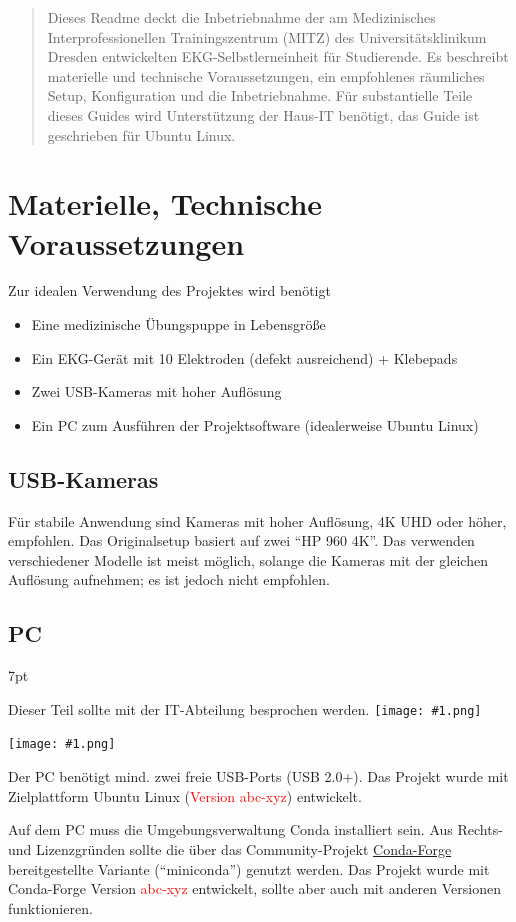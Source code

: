 \documentclass[a4paper]{article}
\newcommand{\warn}[1]{\textcolor{red}{#1}}
\newcommand{\emoji}[1]{
    \begingroup\normalfont
    \texttt{[image: \#1.png]}
    \endgroup
}
\newenvironment{formal}{%
    \def\FrameCommand{%
    \hspace{1pt}%
    {\color{coolpurple}\vrule width 2pt}%
    {\color{formalshade}\vrule width 4pt}%
    \colorbox{formalshade}%
    }%
    \MakeFramed{\advance\hsize-\width\FrameRestore}%
    \noindent\hspace{-4.55pt}%
    \begin{adjustwidth}{}{7pt}%
    \vspace{2pt}\vspace{2pt}%
}
{%
    \vspace{2pt}\end{adjustwidth}\endMakeFramed%
}
\begin{document}
\begin{abstract}
    Dieses Readme deckt die Inbetriebnahme der am Medizinisches Interprofessionellen Trainingszentrum (MITZ) des Universitätsklinikum Dresden entwickelten EKG-Selbstlerneinheit für Studierende. Es beschreibt materielle und technische Voraussetzungen, ein empfohlenes räumliches Setup, Konfiguration und die Inbetriebnahme.
    Für substantielle Teile dieses Guides wird Unterstützung der Haus-IT benötigt, das Guide ist geschrieben für Ubuntu Linux.
\end{abstract}

\section{Materielle, Technische Voraussetzungen}
\label{sec:prerequisites}
Zur idealen Verwendung des Projektes wird benötigt
\begin{itemize}
    \item Eine medizinische Übungspuppe in Lebensgröße
    \item Ein EKG-Gerät mit 10 Elektroden (defekt ausreichend) + Klebepads
    \item Zwei USB-Kameras mit hoher Auflösung
    \item Ein PC zum Ausführen der Projektsoftware (idealerweise Ubuntu Linux)
\end{itemize}

\subsection{USB-Kameras}
Für stabile Anwendung sind Kameras mit hoher Auflösung, 4K UHD oder höher, empfohlen. Das Originalsetup basiert auf zwei \enquote{HP 960 4K}. Das verwenden verschiedener Modelle ist meist möglich, solange die Kameras mit der gleichen Auflösung aufnehmen; es ist jedoch nicht empfohlen.

\subsection{PC}
\begin{formal}
    Dieser Teil sollte mit der IT-Abteilung besprochen werden.\emoji{technologist}\emoji{warning}
\end{formal}
Der PC benötigt mind. zwei freie USB-Ports (USB 2.0+). Das Projekt wurde mit Zielplattform Ubuntu Linux (\warn{Version abc-xyz}) entwickelt.

Auf dem PC muss die Umgebungsverwaltung Conda installiert sein. Aus Rechts- und Lizenzgründen sollte die über das Community-Projekt \href{https://conda-forge.org/}{Conda-Forge} bereitgestellte Variante (\enquote{miniconda}) genutzt werden. Das Projekt wurde mit Conda-Forge Version \warn{abc-xyz} entwickelt, sollte aber auch mit anderen Versionen funktionieren.
\end{document}
